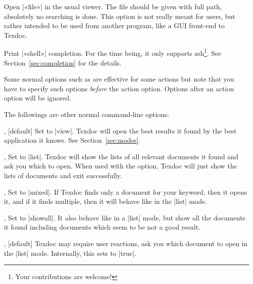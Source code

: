 \documentclass{texdoc-doc}
\begin{document}
\begin{clopt}{}
Open |«file»| in the usual viewer. The file should be given with full path,
absolutely no searching is done. This option is not really meant for users,
but rather intended to be used from another program, like a GUI front-end to
Texdoc.
\end{clopt}

\begin{clopt}{}
Print |«shell»| completion. For the time being, it only supports
zsh\footnote{Your contributions are welcome!}. See
Section~\ref{sec:completion} for the details.
\end{clopt}

Some normal options such as  are effective for some actions but note
that you have to specify such options \emph{before} the action option. Options
after an action option will be ignored.

The followings are other normal command-line options:

\begin{clopt}{, }[default]
Set  to |view|. Texdoc will open the best results it found by the best
application it knows. See Section~\ref{sec:modes}.
\end{clopt}

\begin{clopt}{, }
Set  to |list|. Texdoc will show the lists of all relevant documents
it found and ask you which to open. When used with the 
option, Texdoc will just show the lists of documents and exit successfully.
\end{clopt}

\begin{clopt}{, }
Set  to |mixed|. If Texdoc finds only a document for your keyword,
then it opens it, and if it finds multiple, then it will behave like in the
|list| mode.
\end{clopt}

\begin{clopt}{, }
Set  to |showall|. It also behave like in a |list| mode, but show all
the documents it found including documents which seem to be not a good result.
\end{clopt}

\begin{clopt}{, }[default]
Texdoc may require user reactions, \eg ask you which document to open in the
|list| mode. Internally, this sets  to |true|.
\end{clopt}
\end{document}
